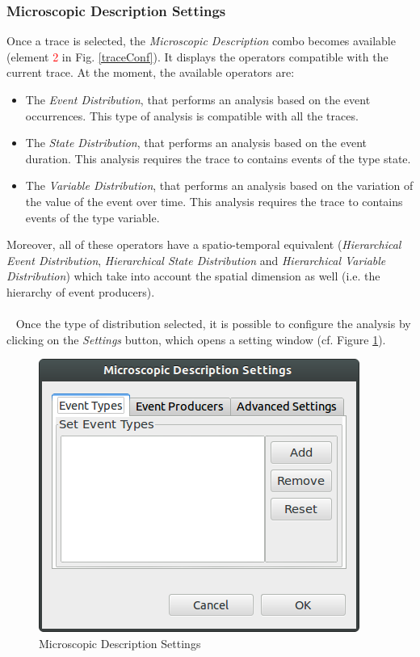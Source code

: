 \documentclass[twoside]{article}
\begin{document}
\begin{sloppypar}
\subsubsection{Microscopic Description Settings}
Once a trace is selected, the \textit{Microscopic Description} combo becomes available (element \textcolor{red}{2} in Fig. \ref{traceConf}). It displays the operators compatible with the current trace. At the moment, the available operators are: 
\begin{itemize}
	\item The \textit{Event Distribution}, that performs an analysis based on the event occurrences. This type of analysis is compatible with all the traces.
	\item The \textit{State Distribution}, that performs an analysis based on the event duration. This analysis requires the trace to contains events of the type state.
	\item The \textit{Variable Distribution}, that performs an analysis based on the variation of the value of the event over time. This analysis requires the trace to contains events of the type variable.
\end{itemize}
Moreover, all of these operators have a spatio-temporal equivalent (\textit{Hierarchical Event Distribution}, \textit{Hierarchical State Distribution} and \textit{Hierarchical Variable Distribution}) which take into account the spatial dimension as well (i.e. the hierarchy of event producers).
\\ ~
\\ ~ 
Once the type of distribution selected, it is possible to configure the analysis by clicking on the \textit{Settings} button, which opens a setting window (cf. Figure \ref{microSettings}). 
\begin{figure}[h!]
	\centering
	\includegraphics[scale=0.6]{images/state_settings.png}
	\caption{Microscopic Description Settings}
	\label{microSettings}
\end{figure}


\end{sloppypar}
\end{document}
